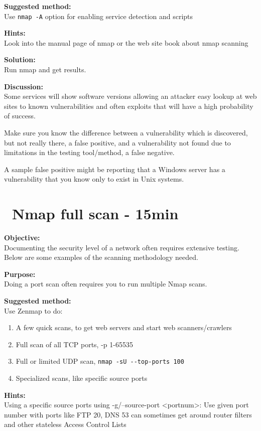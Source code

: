 \documentclass[a4paper,11pt,notitlepage]{report}
\begin{document}
{\bf Suggested method:}\\
Use \verb+nmap -A+ option for enabling service detection and scripts

{\bf Hints:} \\
Look into the manual page of nmap or the web site book about nmap scanning

{\bf Solution:}\\
Run nmap and get results.

{\bf Discussion:}\\

Some services will show software versions allowing an attacker easy lookup at web sites to known vulnerabilities and often exploits that will have a high probability of success.

Make sure you know the difference between a vulnerability which is discovered, but not really there, a false positive, and a vulnerability not found due to limitations in the testing tool/method, a false negative.

A sample false positive might be reporting that a Windows server has a vulnerability that you know only to exist in Unix systems.


\chapter{\faInfoCircle\ Nmap full scan - 15min}
\label{ex:nmap-strategy}


{\bf Objective:} \\
Documenting the security level of a network often requires extensive testing. Below are some examples of the scanning methodology needed.


{\bf Purpose:}\\
Doing a port scan often requires you to run multiple Nmap scans.


{\bf Suggested method:}\\
Use Zenmap to do:
\begin{enumerate}
\item A few quick scans, to get web servers and start web scanners/crawlers
\item Full scan of all TCP ports, -p 1-65535
\item Full or limited UDP scan, \verb+nmap -sU --top-ports 100+
\item Specialized scans, like specific source ports
\end{enumerate}


{\bf Hints:} \\
Using a specific source ports using -g/--source-port <portnum>: Use given port number with ports like FTP 20, DNS 53 can sometimes get around router filters and other stateless Access Control Lists
\end{document}

